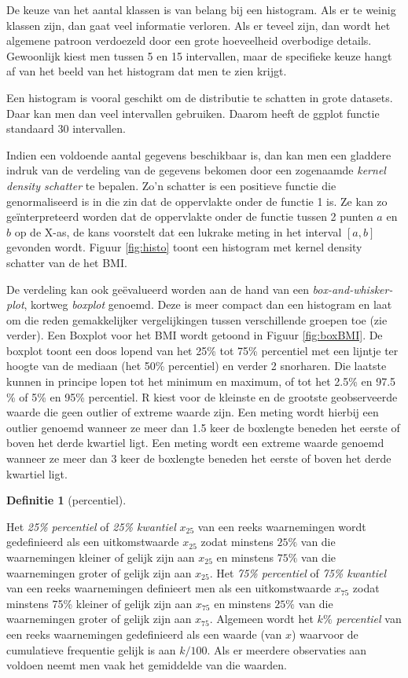 \documentclass[
  12pt,dutch,coursenotes]{book}
\theoremstyle{definition}
\newtheorem{definition}{Definitie}[chapter]
\theoremstyle{definition}
\theoremstyle{definition}
\theoremstyle{definition}
\theoremstyle{remark}
\begin{document}
De keuze van het aantal klassen is van belang bij een histogram. Als er te
weinig klassen zijn, dan gaat veel informatie verloren. Als er teveel zijn,
dan wordt het algemene patroon verdoezeld door een grote hoeveelheid overbodige
details. Gewoonlijk kiest men tussen 5 en 15 intervallen, maar de specifieke
keuze hangt af van het beeld van het histogram dat men te zien krijgt.

Een histogram is vooral geschikt om de distributie te schatten in grote datasets. Daar kan men dan veel intervallen gebruiken. Daarom heeft de ggplot functie standaard 30 intervallen.

Indien een voldoende aantal gegevens beschikbaar is, dan kan men een
gladdere indruk van de verdeling van de gegevens bekomen door een zogenaamde \emph{kernel density schatter} te bepalen. Zo'n schatter is een positieve functie die genormaliseerd is in die zin dat de oppervlakte onder de functie 1 is. Ze kan zo geïnterpreteerd worden dat de oppervlakte onder de functie tussen 2 punten \(a\) en \(b\) op de X-as, de kans voorstelt dat een lukrake meting in het interval \([a,b]\) gevonden wordt. Figuur \ref{fig:histo} toont een histogram met kernel density schatter van de het BMI.

De verdeling kan ook geëvalueerd worden aan de hand van een \emph{box-and-whisker-plot}, kortweg \emph{boxplot} genoemd. Deze is
meer compact dan een histogram en laat om die reden gemakkelijker
vergelijkingen tussen verschillende groepen toe (zie verder). Een Boxplot voor het BMI wordt getoond in Figuur \ref{fig:boxBMI}. De boxplot toont een
doos lopend van het 25\% tot 75\% percentiel met een lijntje ter hoogte van de
mediaan (het 50\% percentiel) en verder 2 snorharen. Die laatste kunnen in principe lopen tot het
minimum en maximum, of tot het 2.5\% en 97.5 \% of 5\% en 95\% percentiel.
R kiest voor de kleinste en de grootste geobserveerde waarde die geen
outlier of extreme waarde zijn. Een meting wordt hierbij een outlier genoemd
wanneer ze meer dan 1.5 keer de boxlengte beneden het eerste of boven het
derde kwartiel ligt. Een meting wordt een extreme waarde genoemd wanneer ze
meer dan 3 keer de boxlengte beneden het eerste of boven het derde kwartiel
ligt.

\begin{definition}[percentiel]
\protect\hypertarget{def:unnamed-chunk-90}{}{\label{def:unnamed-chunk-90} {} }
\end{definition}
Het \emph{25\% percentiel} of \emph{25\% kwantiel} \(x_{25}\) van een
reeks waarnemingen wordt gedefinieerd als een uitkomstwaarde \(x_{25}\) zodat
minstens \(25\%\) van die waarnemingen kleiner of gelijk zijn aan \(x_{25}\) en
minstens \(75\%\) van die waarnemingen groter of gelijk zijn aan \(x_{25}\). Het
\emph{75\% percentiel} of \emph{75\% kwantiel} van een reeks
waarnemingen definieert men als een uitkomstwaarde \(x_{75}\) zodat minstens 75\%
kleiner of gelijk zijn aan \(x_{75}\) en minstens \(25\%\) van die waarnemingen
groter of gelijk zijn aan \(x_{75}\). Algemeen wordt het \emph{\(k\%\)
percentiel} van een reeks waarnemingen gedefinieerd als een waarde (van \(x\))
waarvoor de cumulatieve frequentie gelijk is aan \(k/100.\) Als er meerdere
observaties aan voldoen neemt men vaak het gemiddelde van die waarden.
\end{document}
